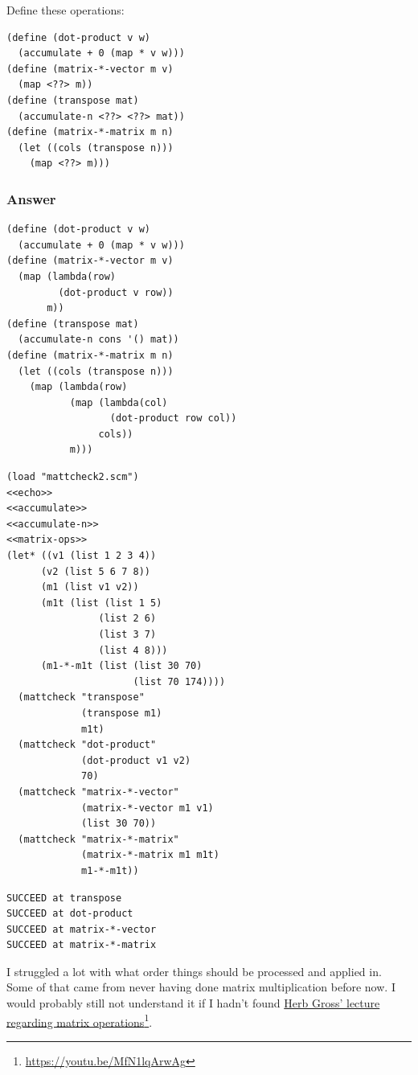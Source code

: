 \documentclass[final,fleqn,titlepage,twoside]{article}
\begin{document}
Define these operations:

\begin{verbatim}
(define (dot-product v w)
  (accumulate + 0 (map * v w)))
(define (matrix-*-vector m v)
  (map <??> m))
(define (transpose mat)
  (accumulate-n <??> <??> mat))
(define (matrix-*-matrix m n)
  (let ((cols (transpose n)))
    (map <??> m)))
\end{verbatim}
\subsubsection{Answer}
\label{sec:org0c49417}
\begin{verbatim}
(define (dot-product v w)
  (accumulate + 0 (map * v w)))
(define (matrix-*-vector m v)
  (map (lambda(row)
         (dot-product v row))
       m))
(define (transpose mat)
  (accumulate-n cons '() mat))
(define (matrix-*-matrix m n)
  (let ((cols (transpose n)))
    (map (lambda(row)
           (map (lambda(col)
                  (dot-product row col))
                cols))
           m)))
\end{verbatim}
\begin{verbatim}
(load "mattcheck2.scm")
<<echo>>
<<accumulate>>
<<accumulate-n>>
<<matrix-ops>>
(let* ((v1 (list 1 2 3 4))
      (v2 (list 5 6 7 8))
      (m1 (list v1 v2))
      (m1t (list (list 1 5)
                (list 2 6)
                (list 3 7)
                (list 4 8)))
      (m1-*-m1t (list (list 30 70)
                      (list 70 174))))
  (mattcheck "transpose"
             (transpose m1)
             m1t)
  (mattcheck "dot-product"
             (dot-product v1 v2)
             70)
  (mattcheck "matrix-*-vector"
             (matrix-*-vector m1 v1)
             (list 30 70))
  (mattcheck "matrix-*-matrix"
             (matrix-*-matrix m1 m1t)
             m1-*-m1t))
\end{verbatim}

\begin{verbatim}
SUCCEED at transpose
SUCCEED at dot-product
SUCCEED at matrix-*-vector
SUCCEED at matrix-*-matrix
\end{verbatim}

I struggled a lot with what order things should be processed and applied in.
Some of that came from never having done matrix multiplication before now. I
would probably still not understand it if I hadn't found \href{https://youtu.be/MfN1lqArwAg}{Herb Gross' lecture
regarding matrix operations}\footnote{\url{https://youtu.be/MfN1lqArwAg}}.
\end{document}
